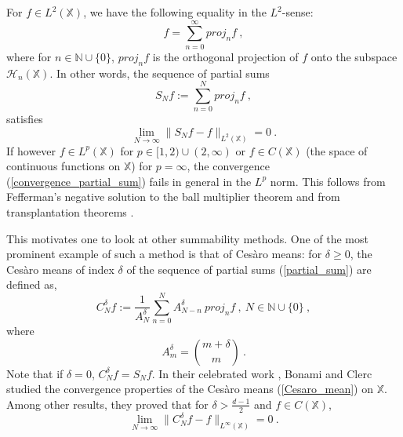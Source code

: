 \documentclass[12pt]{amsart}
\theoremstyle{definition}
\newcommand{\N}{\mathbb N}%
\newcommand{\X}{\mathbb X}%
\numberwithin{equation}{section}
\begin{document}
For $f \in L^2(\X)$, we have the following equality in the $L^2$-sense:
\begin{equation*}
f=\sum_{n=0}^\infty proj_nf\:,
\end{equation*}
where for $n \in \N \cup \{0\}$, $proj_nf$ is the orthogonal projection of $f$ onto the subspace $\mathscr{H}_n(\X)$. In other words, the sequence of partial sums 
\begin{equation} \label{partial_sum}
S_Nf:=\sum_{n=0}^N proj_nf\:,
\end{equation}
satisfies
\begin{equation} \label{convergence_partial_sum}
\lim_{N \to \infty} \|S_Nf-f\|_{L^2(\X)}=0\:.
\end{equation}
If however $f \in L^p(\X)$ for $p \in [1,2) \cup (2,\infty)$ or $f \in C(\X)$ (the space of continuous functions on $\X$) for $p=\infty$, the convergence (\ref{convergence_partial_sum}) fails in general in the $L^p$ norm.  This follows from Fefferman's negative solution to the ball multiplier theorem \cite{Fefferman} and from transplantation theorems \cite{Mitjagin}.

This motivates one to look at other summability methods. One of the most prominent example of such a method is that of Ces\`aro means: for $\delta \ge 0$, the Ces\`aro means of index $\delta$ of the sequence of partial sums (\ref{partial_sum}) are defined as,
\begin{equation} \label{Cesaro_mean}
C^\delta_Nf := \frac{1}{A^\delta_N} \sum_{n=0}^N A^\delta_{N-n}\:proj_nf\:,\: N \in \N \cup \{0\}\:,
\end{equation}
where
\begin{equation*}
A^\delta_m= {m+\delta \choose m}\:.
\end{equation*}
Note that if $\delta=0$, $C^\delta_Nf=S_Nf$. In their celebrated work \cite{Bonami}, Bonami and Clerc studied the convergence properties of the Ces\`aro means (\ref{Cesaro_mean}) on $\X$. Among other results, they proved that for $\delta > \frac{d-1}{2}$ and $f \in C(\X)$, 
\begin{equation} \label{cesaro_convergence}
\lim_{N \to \infty} \|C^\delta_Nf-f\|_{L^\infty(\X)}=0\:.
\end{equation} 
\end{document}
